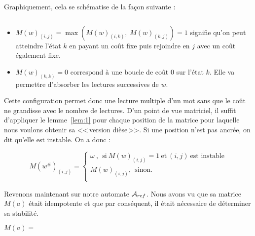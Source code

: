 \documentclass[12pt]{memoir}
\begin{document}
Graphiquement, cela se schématise de la façon suivante :
\begin{center}
\end{center}
$ $\\
\begin{itemize}
\item $M(w)_{(i,j)} = \max(M(w)_{(i,k)}, \; M(w)_{(k,j)}) = 1$ signifie qu'on peut atteindre l'état $k$ en payant un coût fixe puis rejoindre en $j$ avec un coût également fixe. 
\item $M(w)_{(k,k)} = 0$ correspond à une boucle de coût 0 sur l'état $k$. Elle va permettre d'absorber les lectures successives de $w$.
\end{itemize}

\medskip\noindent
Cette configuration permet donc une lecture multiple d'un mot sans que le coût ne grandisse avec le nombre de lectures. D'un point de vue matriciel, il suffit d'appliquer le lemme~\ref{lem:1} pour chaque position de la matrice pour laquelle nous voulons obtenir sa <<\,version dièse\,>>. Si une position n'est pas ancrée, on dit qu'elle est instable. On a donc :

\[
M(w^{\#})_{(i,j)} = 
				\left\{
					\begin{array}{l }
						\omega\ ,\ \ \text{si}\ M(w)_{(i,j)} = 1 \ \text{et}\ (i,j)\ \text{est\ instable}\\
						M(w)_{(i,j)}, \ \ \text{sinon.} \\						
					\end{array}
				\right.
\]

Revenons maintenant sur notre automate $\mathcal{A}_{ref}$. Nous avons vu que sa matrice $M(a)$ était idempotente et que par conséquent, il était nécessaire de déterminer sa stabilité.

\begin{center}
$M(a)=$
\end{center}
\end{document}
